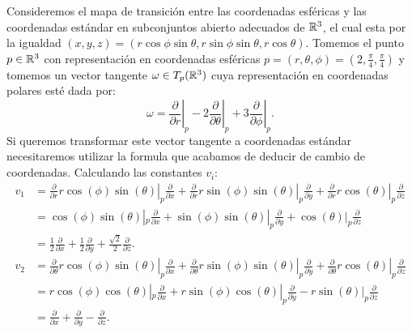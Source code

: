 \begin{example}
	Consideremos el mapa de transición entre las coordenadas esféricas y las coordenadas estándar en subconjuntos abierto adecuados de $\mathbb{R}^{3}$, el cual esta por la igualdad $(x,y,z) = (r \cos \phi \sin \theta, r \sin \phi \sin \theta, r\cos \theta)$. Tomemos el punto $p \in \mathbb{R}^{3}$ con representación en coordenadas esféricas $p = (r,\theta,\phi) = (2,\frac{\pi}{4},\frac{\pi}{4})$ y tomemos un vector tangente $\omega \in T_p(\mathbb{R}^3)$ cuya representación en coordenadas polares esté dada por:
	\[
		\omega = \left. \frac{\partial}{\partial r} \right|_p -
		\left. 2\frac{\partial}{\partial \theta} \right|_p +
		\left. 3\frac{\partial}{\partial \phi} \right|_p.
	\]
	Si queremos transformar este vector tangente a coordenadas estándar necesitaremos utilizar la formula que acabamos de deducir de cambio de coordenadas. Calculando las constantes $v_i$:
	\begin{align*}
		v_1 & =
		\left. \frac{\partial}{\partial r} r\cos(\phi)\sin(\theta) \right|_p
		\frac{\partial}{\partial x} +
		\left. \frac{\partial}{\partial r} r\sin(\phi)\sin(\theta)\right|_p
		\frac{\partial}{\partial y} +
		\left. \frac{\partial}{\partial r}r\cos(\theta)\right|_{p}
		\frac{\partial}{\partial z}                                          \\
		    & = \cos(\phi)\sin(\theta)|_p \frac{\partial}{\partial x}
		+ \sin(\phi)\sin(\theta)|_p  \frac{\partial}{\partial y}
		+ \cos(\theta)|_p \frac{\partial}{\partial z}                        \\
		    & = \frac{1}{2} \frac{\partial}{\partial x}
		+ \frac{1}{2} \frac{\partial}{\partial y}
		+ \frac{\sqrt{2}}{2} \frac{\partial}{\partial z}.                    \\
		v_2 & =
		\left. \frac{\partial}{\partial \theta} r\cos(\phi)\sin(\theta) \right|_p
		\frac{\partial}{\partial x} +
		\left. \frac{\partial}{\partial \theta} r\sin(\phi)\sin(\theta)\right|_p
		\frac{\partial}{\partial y} +
		\left. \frac{\partial}{\partial \theta}r\cos(\theta)\right|_{p}
		\frac{\partial}{\partial z}                                          \\
		    & = r\cos(\phi)\cos(\theta)|_p \frac{\partial}{\partial x}
		+ r\sin(\phi)\cos(\theta)|_p  \frac{\partial}{\partial y}
		- r\sin(\theta)|_p \frac{\partial}{\partial z}                       \\
		    & = \frac{\partial}{\partial x} + \frac{\partial }{\partial y}
		- \frac{\partial}{\partial z}.                                       \\

\end{align*}
\end{example}
